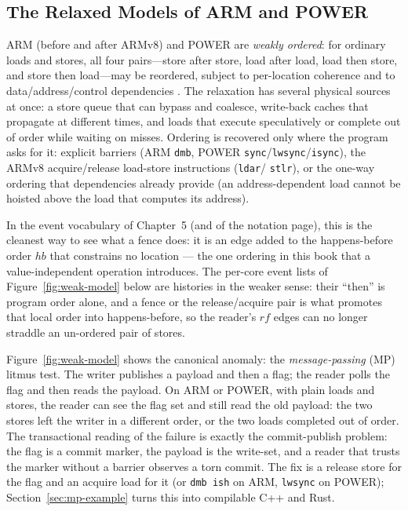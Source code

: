\subsection{The Relaxed Models of ARM and POWER}
\label{sec:weak-model}

ARM (before and after ARMv8) and POWER are \emph{weakly ordered}: for
ordinary loads and stores, all four pairs---store after store, load after
load, load then store, and store then load---may be reordered, subject to
per-location coherence and to data/address/control dependencies
\cite{alglave17fencing,sorin11primer}. The relaxation has several physical
sources at once: a store queue that can bypass and coalesce, write-back
caches that propagate at different times, and loads that execute
speculatively or complete out of order while waiting on misses. Ordering
is recovered only where the program asks for it: explicit barriers (ARM
\texttt{dmb}, POWER \texttt{sync}/\texttt{lwsync}/\texttt{isync}),
the ARMv8 acquire/release load-store instructions (\texttt{ldar}/
\texttt{stlr}), or the one-way ordering that dependencies already provide
(an address-dependent load cannot be hoisted above the load that computes
its address).

In the event vocabulary of Chapter~5 (and of the notation page), this is
the cleanest way to see what a fence does: it is an edge added to the
happens-before order $\mathit{hb}$ that constrains no
location --- the one ordering in this book that a value-independent
operation introduces. The per-core event lists of Figure~\ref{fig:weak-model}
below are histories in the weaker sense: their ``then'' is program order
alone, and a fence or the release/acquire pair is what promotes that local
order into happens-before, so the reader's $\mathit{rf}$ edges can no longer
straddle an un-ordered pair of stores.

Figure~\ref{fig:weak-model} shows the canonical anomaly: the
\emph{message-passing} (MP) litmus test. The writer publishes a payload
and then a flag; the reader polls the flag and then reads the payload.
On ARM or POWER, with plain loads and stores, the reader can see the flag
set and still read the old payload: the two stores left the writer in a
different order, or the two loads completed out of order. The transactional
reading of the failure is exactly the commit-publish problem: the flag is
a commit marker, the payload is the write-set, and a reader that trusts
the marker without a barrier observes a torn commit. The fix is a release
store for the flag and an acquire load for it (or \texttt{dmb ish} on
ARM, \texttt{lwsync} on POWER); Section~\ref{sec:mp-example} turns this
into compilable C++ and Rust.

